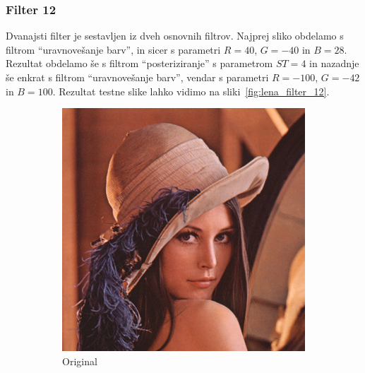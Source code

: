 \documentclass[a4paper, 12pt]{book}
\begin{document}
\subsubsection*{Filter 12}
Dvanajsti filter je sestavljen iz dveh osnovnih filtrov. Najprej sliko obdelamo s
filtrom ``uravnovešanje barv'', in sicer s parametri $R = 40$, $G = -40$ in
$B = 28$. Rezultat obdelamo še s filtrom ``posteriziranje'' s parametrom
$ST= 4$ in nazadnje še enkrat s filtrom ``uravnovešanje barv'', vendar s
parametri $R = -100$, $G = -42$ in $B = 100$. Rezultat testne slike lahko
vidimo na sliki~\ref{fig:lena_filter_12}.

\begin{figure}[!ht]
    \centering
    \begin{subfigure}[b]{0.4\textwidth}
        \includegraphics[width=\textwidth]{lena}
        \caption{Original}
    \end{subfigure}
    \begin{subfigure}[b]{0.4\textwidth}

\end{subfigure}
\end{figure}
\end{document}
